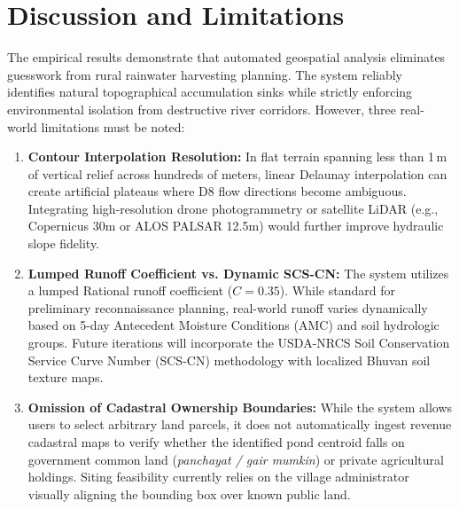 \documentclass[manuscript,screen,review]{acmart}
\begin{document}
\section{Discussion and Limitations}
\label{sec:discussion}
The empirical results demonstrate that automated geospatial analysis eliminates guesswork from rural rainwater harvesting planning. The system reliably identifies natural topographical accumulation sinks while strictly enforcing environmental isolation from destructive river corridors. However, three real-world limitations must be noted:
\begin{enumerate}
    \item \textbf{Contour Interpolation Resolution:} In flat terrain spanning less than 1\,m of vertical relief across hundreds of meters, linear Delaunay interpolation can create artificial plateaus where D8 flow directions become ambiguous. Integrating high-resolution drone photogrammetry or satellite LiDAR (e.g., Copernicus 30m or ALOS PALSAR 12.5m) would further improve hydraulic slope fidelity.
    \item \textbf{Lumped Runoff Coefficient vs. Dynamic SCS-CN:} The system utilizes a lumped Rational runoff coefficient ($C = 0.35$). While standard for preliminary reconnaissance planning, real-world runoff varies dynamically based on 5-day Antecedent Moisture Conditions (AMC) and soil hydrologic groups. Future iterations will incorporate the USDA-NRCS Soil Conservation Service Curve Number (SCS-CN) methodology with localized Bhuvan soil texture maps.
    \item \textbf{Omission of Cadastral Ownership Boundaries:} While the system allows users to select arbitrary land parcels, it does not automatically ingest revenue cadastral maps to verify whether the identified pond centroid falls on government common land (\emph{panchayat / gair mumkin}) or private agricultural holdings. Siting feasibility currently relies on the village administrator visually aligning the bounding box over known public land.
\end{enumerate}

\end{document}
